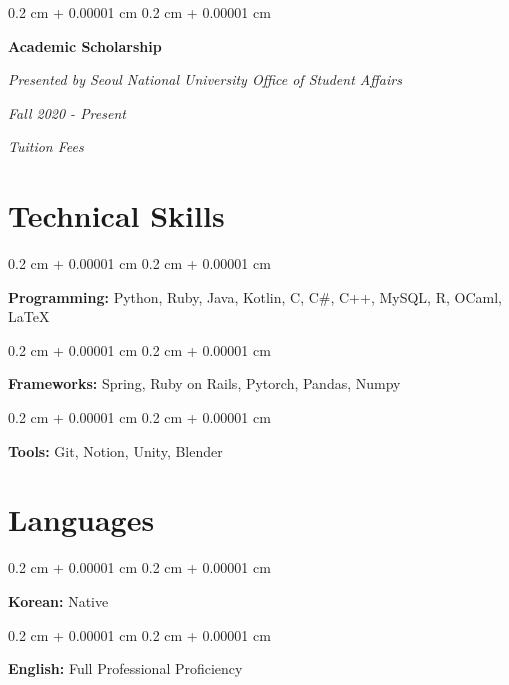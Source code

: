 \documentclass[10pt, letterpaper]{article}
\newenvironment{onecolentry}{
    \begin{adjustwidth}{
        0.2 cm + 0.00001 cm
    }{
        0.2 cm + 0.00001 cm
    }
}{
    \end{adjustwidth}
} %
\newenvironment{twocolentry}[2][]{
    \onecolentry
    \def\secondColumn{#2}
    \setcolumnwidth{\fill, 4.5 cm}
    \begin{paracol}{2}
}{
    \switchcolumn \raggedleft \secondColumn
    \end{paracol}
    \endonecolentry
} %
\begin{document}
        \vspace{0.3 cm}

        \begin{twocolentry}{
        \textit{Fall 2020 - Present}    
            
        \textit{Tuition Fees}}
            \textbf{Academic Scholarship}
            
            \textit{Presented by Seoul National University Office of Student Affairs}
        \end{twocolentry}

    
    \section{Technical Skills}

        \begin{onecolentry}
            \textbf{Programming:} Python, Ruby, Java, Kotlin, C, C\#, C++, MySQL, R, OCaml, LaTeX
        \end{onecolentry}

        \vspace{0.2 cm}

        \begin{onecolentry}
            \textbf{Frameworks:} Spring, Ruby on Rails, Pytorch, Pandas, Numpy
        \end{onecolentry}

        \vspace{0.2 cm}

        \begin{onecolentry}
            \textbf{Tools:} Git, Notion, Unity, Blender
        \end{onecolentry}   


    \section{Languages}

        \begin{onecolentry}
            \textbf{Korean:} Native
        \end{onecolentry}

        \vspace{0.2 cm}

        \begin{onecolentry}
            \textbf{English:} Full Professional Proficiency
        \end{onecolentry}
\end{document}
